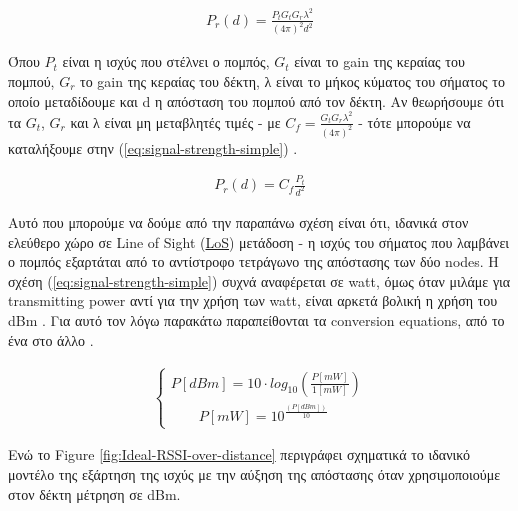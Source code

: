 \begin{align}
	P_r(d)=\frac{P_tG_tG_r\lambda^2}{(4\pi)^2d^2} \label{eq:signal-strength}
\end{align}

Όπου $P_t$ είναι η ισχύς που στέλνει ο πομπός, $G_t$ είναι το gain της κεραίας του
πομπού, $G_r$ το gain της κεραίας του δέκτη, λ είναι το μήκος κύματος του σήματος
το οποίο μεταδίδουμε και d η απόσταση του πομπού από τον δέκτη. Αν θεωρήσουμε ότι 
τα $G_t$, $G_r$ και λ είναι μη μεταβλητές τιμές - με $C_f = \frac{G_tG_r\lambda^2}{(4\pi)^2}$ - τότε μπορούμε να καταλήξουμε
στην (\ref{eq:signal-strength-simple}) \cite{rssi-simple-formula}.

\begin{align}
	P_r(d)=C_f\frac{P_t}{d^2} \label{eq:signal-strength-simple}
\end{align}

Αυτό που μπορούμε να δούμε από την παραπάνω σχέση είναι ότι, ιδανικά στον ελεύθερο 
χώρο σε Line of Sight (\hyperref[abbr:LoS]{LoS}) μετάδοση -
η ισχύς του σήματος που λαμβάνει ο πομπός εξαρτάται από το αντίστροφο τετράγωνο της
απόστασης των δύο nodes. Η σχέση (\ref{eq:signal-strength-simple}) συχνά αναφέρεται σε watt, 
όμως όταν μιλάμε για transmitting power αντί για την χρήση των watt, είναι αρκετά βολική
η χρήση του dBm \cite{wikipedia-dBm}. Για αυτό τον λόγω παρακάτω παραπείθονται τα conversion
equations, από το ένα στο άλλο \cite{rssi-wlan} \cite{wikipedia-dBm}. 

\begin{align}
	\left\{
		\begin{array}{ll}
			P[dBm]= 10\cdot log_{10}\left(\frac{P[mW]}{1[mW]}\right) \\[10pt]
			\quad \quad P[mW] = 10^\frac{(P[dBm])}{10}
		\end{array}
	\right.
\end{align}

Ενώ το Figure \ref{fig:Ideal-RSSI-over-distance} περιγράφει σχηματικά το ιδανικό μοντέλο της εξάρτηση της ισχύς με την αύξηση
της απόστασης όταν χρησιμοποιούμε στον δέκτη μέτρηση σε dΒm. 


